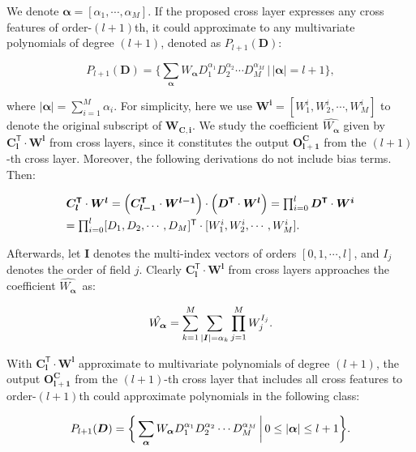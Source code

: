 \documentclass[letterpaper]{article} \usepackage{aaai21}  \usepackage{times}  \usepackage{helvet} \usepackage{courier}  \usepackage[hyphens]{url}  \usepackage{graphicx} \urlstyle{rm} \def\UrlFont{\rm}  \usepackage{natbib}  \usepackage{caption} \frenchspacing  \setlength{\pdfpagewidth}{8.5in}  \setlength{\pdfpageheight}{11in}  \usepackage{graphicx}
\begin{document}
We denote $\bm{\alpha} = [\alpha_{1}, \cdots, \alpha_{M}]$. If the proposed cross layer expresses any cross features of order-$(l+1)$th, it could approximate to any multivariate polynomials of degree $(l+1)$, denoted as $P_{l+1}(\bm{D})$: 
\begin{small}
\begin{equation}
P_{l+1}(\bm{D}) = \bigg \{ \sum_{\bm{\alpha}} W_{\bm{\alpha}} D_1^{\alpha_1} D_2^{\alpha_2} \cdots D_M^{\alpha_M} \, \bigg | \,|\bm{\alpha}|=l+1 \bigg \},
\end{equation}\end{small}where $|\bm{\alpha}|=\sum_{i=1}^{M}\alpha_{i}$. For simplicity, here we use $\bm{W^{i}} = [W^{i}_1, W^{i}_2, \cdots, W^{i}_M]$ to denote the original subscript of $\bm{W_{C,i}}$. We study the coefficient $\hat{W_{\bm{\alpha}}}$ given by $\bm{C_l^{\mathsf{T}}} \cdot \bm{W^{l}}$ from cross layers, since it constitutes the output $\bm{O_{l+1}^{C}}$ from the $(l+1)$-th cross layer. Moreover, the following derivations do not include bias terms. Then: 
\begin{small}
\begin{equation}
\begin{array}{l}
 \bm{C_l^{\mathsf{T}}} \cdot \bm{W^{l}} = \Big(\bm{C_{l-1}^{\mathsf{T}}} \cdot \bm{W^{l-1}} \Big) \cdot \Big( \bm{D^\mathsf{T}} \cdot \bm{W^{l}} \Big) = \prod_{i=0}^{l} \bm{D^{\mathsf{T}}} \cdot \bm{W^{i}} \vspace{0.1cm} \\
= \prod_{i=0}^{l} [D_1, D_2, \cdots, D_M]^{\mathsf{T}} \cdot [W^{i}_1, W^{i}_2, \cdots, W^{i}_M].
\end{array}
\end{equation}
\end{small}Afterwards, let $\bm{I}$ denotes the multi-index vectors of orders $[0, 1, \cdots, l]$, and $I_j$ denotes the order of field $j$. Clearly $\bm{C_l^{\mathsf{T}}} \cdot \bm{W^{l}}$ from cross layers approaches the coefficient $\hat{W_{\bm{\alpha}}}$~as: 
\begin{small}
\begin{equation}
\hat{W_{\bm{\alpha}}} = \sum_{k=1}^{M} \sum_{|\bm{I}|=\alpha_k} \prod_{j=1}^{M} W_{j}^{I_j}. \vspace{-0.2cm}
\end{equation}
\end{small}With $\bm{C_l^{\mathsf{T}}} \cdot \bm{W^{l}}$ approximate to multivariate polynomials of degree $(l+1)$, the output $\bm{O^{C}_{l+1}}$ from the $(l+1)$-th cross layer that includes all cross features to order-$(l+1)$th could approximate polynomials in the following class: 
\begin{small}
\begin{equation}
P_{l+1}(\bm{D}) = \bigg \{ \sum_{\bm{\alpha}} W_{\bm{\alpha}} D_1^{\alpha_1} D_2^{\alpha_2} \cdots D_M^{\alpha_M} \, \bigg | \,0 \le |\bm{\alpha} | \le l+1 \bigg \}. \vspace{-0.3cm}
\end{equation}
\end{small}
\end{document}
